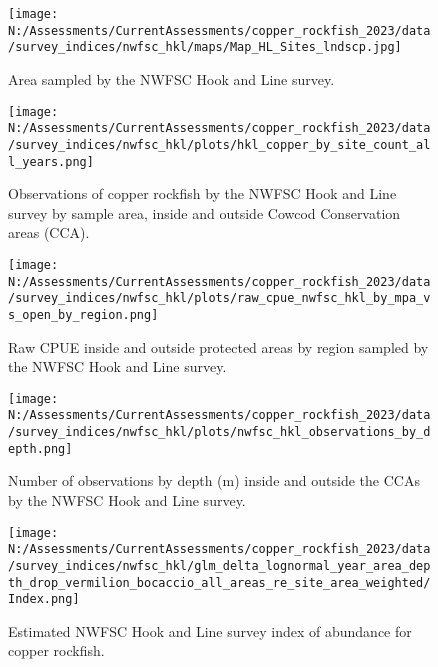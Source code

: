 \documentclass[11pt,
  english,
  letterpaper,
]{article}
\begin{document}
\pagebreak

\begin{figure}
\centering
\texttt{[image: N:/Assessments/CurrentAssessments/copper\_rockfish\_2023/data/survey\_indices/nwfsc\_hkl/maps/Map\_HL\_Sites\_lndscp.jpg]}
\caption{Area sampled by the NWFSC Hook and Line survey.\label{fig:nwfsc-hkl-map}}
\end{figure}

\pagebreak

\begin{figure}
\centering
\texttt{[image: N:/Assessments/CurrentAssessments/copper\_rockfish\_2023/data/survey\_indices/nwfsc\_hkl/plots/hkl\_copper\_by\_site\_count\_all\_years.png]}
\caption{Observations of copper rockfish by the NWFSC Hook and Line survey by sample area, inside and outside Cowcod Conservation areas (CCA).\label{fig:nwfsc-hkl-site}}
\end{figure}

\pagebreak

\begin{figure}
\centering
\texttt{[image: N:/Assessments/CurrentAssessments/copper\_rockfish\_2023/data/survey\_indices/nwfsc\_hkl/plots/raw\_cpue\_nwfsc\_hkl\_by\_mpa\_vs\_open\_by\_region.png]}
\caption{Raw CPUE inside and outside protected areas by region sampled by the NWFSC Hook and Line survey.\label{fig:nwfsc-hkl-region-main}}
\end{figure}

\pagebreak

\begin{figure}
\centering
\texttt{[image: N:/Assessments/CurrentAssessments/copper\_rockfish\_2023/data/survey\_indices/nwfsc\_hkl/plots/nwfsc\_hkl\_observations\_by\_depth.png]}
\caption{Number of observations by depth (m) inside and outside the CCAs by the NWFSC Hook and Line survey.\label{fig:nwfsc-hkl-depth}}
\end{figure}

\pagebreak

\begin{figure}
\centering
\texttt{[image: N:/Assessments/CurrentAssessments/copper\_rockfish\_2023/data/survey\_indices/nwfsc\_hkl/glm\_delta\_lognormal\_year\_area\_depth\_drop\_vermilion\_bocaccio\_all\_areas\_re\_site\_area\_weighted/Index.png]}
\caption{Estimated NWFSC Hook and Line survey index of abundance for copper rockfish.\label{fig:nwfsc-hkl-index-main}}
\end{figure}
\end{document}
